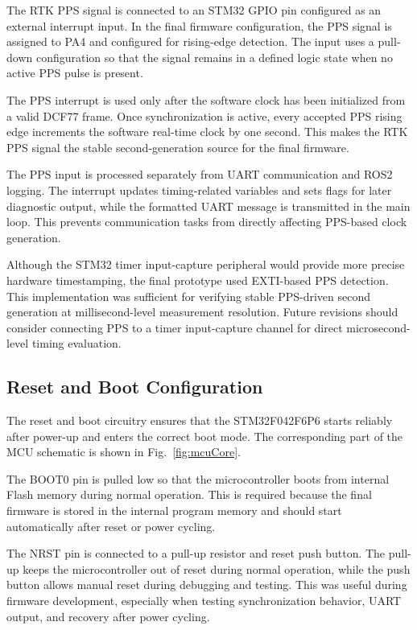 The RTK PPS signal is connected to an STM32 GPIO pin configured as an external interrupt input. In the final firmware configuration, the PPS signal is assigned to PA4 and configured for rising-edge detection. The input uses a pull-down configuration so that the signal remains in a defined logic state when no active PPS pulse is present.

The PPS interrupt is used only after the software clock has been initialized from a valid DCF77 frame. Once synchronization is active, every accepted PPS rising edge increments the software real-time clock by one second. This makes the RTK PPS signal the stable second-generation source for the final firmware.

The PPS input is processed separately from UART communication and ROS2 logging. The interrupt updates timing-related variables and sets flags for later diagnostic output, while the formatted UART message is transmitted in the main loop. This prevents communication tasks from directly affecting PPS-based clock generation.

Although the STM32 timer input-capture peripheral would provide more precise hardware timestamping, the final prototype used EXTI-based PPS detection. This implementation was sufficient for verifying stable PPS-driven second generation at millisecond-level measurement resolution. Future revisions should consider connecting PPS to a timer input-capture channel for direct microsecond-level timing evaluation.

\subsection{Reset and Boot Configuration}

The reset and boot circuitry ensures that the STM32F042F6P6 starts reliably after power-up and enters the correct boot mode. The corresponding part of the MCU schematic is shown in Fig.~\ref{fig:mcuCore}.

The BOOT0 pin is pulled low so that the microcontroller boots from internal Flash memory during normal operation. This is required because the final firmware is stored in the internal program memory and should start automatically after reset or power cycling.

The NRST pin is connected to a pull-up resistor and reset push button. The pull-up keeps the microcontroller out of reset during normal operation, while the push button allows manual reset during debugging and testing. This was useful during firmware development, especially when testing synchronization behavior, UART output, and recovery after power cycling.

